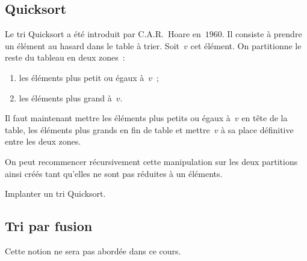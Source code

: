 \subsection{Quicksort}
\label{sec:Quicksort}
\begin{exercice}[Quicksort]
  Le tri Quicksort a \'et\'e introduit par C.A.R.~Hoare en~$1960$. Il
  consiste \`a prendre un \'el\'ement au hasard dans le table \`a
  trier.  Soit~$v$ cet \'el\'ement.  On partitionne le reste du
  tableau en deux zones~:
  \begin{enumerate}
  \item les \'el\'ements plus petit ou \'egaux \`a~$v$~;
  \item les \'el\'ements plus grand \`a~$v$.
  \end{enumerate}
  Il  faut maintenant mettre les  \'el\'ements plus  petits ou \'egaux
  \`a~$v$ en  t\^ete de la table, les  \'el\'ements plus grands en fin
  de  table  et mettre~$v$ \`a  sa  place  d\'efinitive entre les deux
  zones.
  \par
  On peut recommencer r\'ecursivement cette  manipulation sur les deux
  partitions ainsi cr\'e\'es tant  qu'elles ne sont pas r\'eduites \`a
  un \'el\'ements.
  \par
  Implanter un tri Quicksort.
  \ifcorrection
  \begin{correction}
    
  \end{correction}
  \fi
\end{exercice}
\subsection{Tri par fusion}
\label{sec:TriParFusion}
Cette notion ne sera pas abord\'ee dans ce cours.
